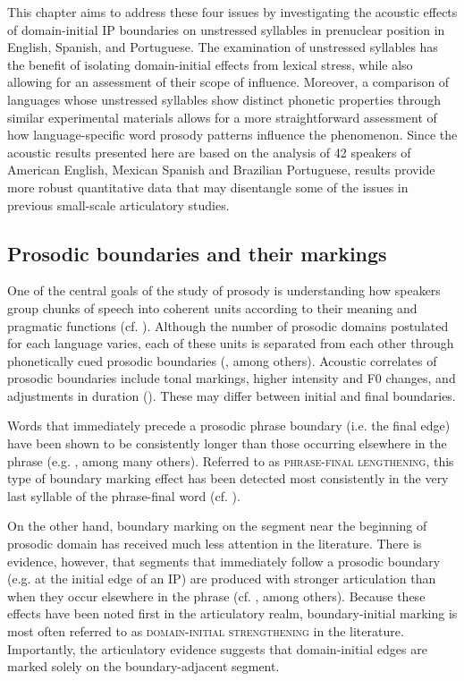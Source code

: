 \documentclass[output=paper]{langscibook}
\begin{document}
This chapter aims to address these four issues by investigating the acoustic effects of domain-initial IP boundaries on unstressed syllables in prenuclear position in English, Spanish, and Portuguese. The examination of unstressed syllables has the benefit of isolating domain-initial effects from lexical stress, while also allowing for an assessment of their scope of influence. Moreover, a comparison of languages whose unstressed syllables show distinct phonetic properties through similar experimental materials allows for a more straightforward assessment of how language-specific word prosody patterns influence the phenomenon. Since the acoustic results presented here are based on the analysis of 42 speakers of American English, Mexican Spanish and Brazilian Portuguese, results provide more robust quantitative data that may disentangle some of the issues in previous small-scale articulatory studies.

\subsection{Prosodic boundaries and their markings}\label{1.1}
One of the central goals of the study of prosody is understanding how speakers group chunks of speech into coherent units according to their meaning and pragmatic functions (cf. \citealt{s84, nv86, j05a}). Although the number of prosodic domains postulated for each language varies, each of these units is separated from each other through phonetically cued prosodic boundaries (\citealt{nv86, st96}, among others). Acoustic correlates of prosodic boundaries include tonal markings, higher intensity and F0 changes, and adjustments in duration (\citealt{f10}). These may differ between initial and final boundaries.

Words that immediately precede a prosodic phrase boundary (i.e. the final edge) have been shown to be consistently longer than those occurring elsewhere in the phrase (e.g. \citealt{jb94, wsop92, gr92, b94, b, Fougeron2001, ts00, fp15}, among many others). Referred to as \textsc{phrase-final lengthening}, this type of boundary marking effect has been detected most consistently in the very last syllable of the phrase-final word (cf. \citealt{ts07}). 

On the other hand, boundary marking on the segment near the beginning of prosodic domain has received much less attention in the literature. There is evidence, however, that segments that immediately follow a prosodic boundary (e.g. at the initial edge of an IP) are produced with stronger articulation than when they occur elsewhere in the phrase (cf. \citealt{dso96, fk97, f99, ck01, ck09, kcfh03, cm05, gf14, c11}, among others). Because these effects have been noted first in the articulatory realm, boundary-initial marking is most often referred to as \textsc{domain-initial strengthening} in the literature. Importantly, the articulatory evidence suggests that domain-initial edges are marked solely on the boundary-adjacent segment. 
\end{document}
